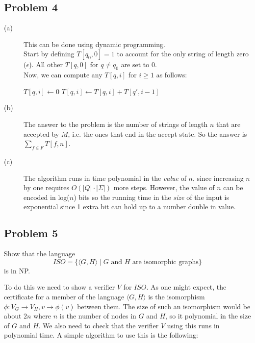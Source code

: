 \documentclass[english]{article}
\begin{document}
\subsection*{Problem 4}
\begin{description}
	\item[(a)] This can be done using dynamic programming.\\
	Start by defining $T[q_0,0] = 1$ to account for the only string of length zero ($\epsilon$).
	All other $T[q,0]$ for $q \ne q_0$ are set to 0.\\
	Now, we can compute any $T[q,i]$ for $i \ge 1$ as follows:
	\begin{algorithmic}
		\State $T[q,i] \gets 0$
				\State $T[q,i] \gets T[q,i] + T[q',i-1]$
			\EndIf
			\EndFor
		\EndFor
	\end{algorithmic}
	
	\item[(b)] The answer to the problem is the number of strings of length $n$ that are accepted
	by $M$, i.e. the ones that end in the accept state. So the answer is $\sum_{f \in F}T[f,n]$.
	
	\item[(c)] The algorithm runs in time polynomial in the \emph{value} of $n$, since increasing
	$n$ by one requires $O(|Q| \cdot |\Sigma|)$ more steps. However, the value of $n$ can be
	encoded in log($n$) bits so the running time in the \emph{size} of the input is exponential
	since 1 extra bit can hold up to a number double in value.
\end{description}

\subsection*{Problem 5}
Show that the language
\[ ISO = \{ \langle G, H \rangle \mid
              \textrm{$G$ and $H$ are isomorphic graphs} \} \]
is in NP.

To do this we need to show a verifier $V$ for $ISO$. As one might expect, the
certificate for a member of the language $\langle G, H \rangle$ is the
isomorphism $\phi: V_G \rightarrow V_H, v \rightarrow \phi(v)$ between them.
The size of such an isomorphism would be about $2n$ where $n$ is the number of
nodes in $G$ and $H$, so it polynomial in the size of $G$ and $H$. 
We also need to check that the verifier $V$ using this runs in polynomial
time. A simple algorithm to use this is the following:
\end{document}
